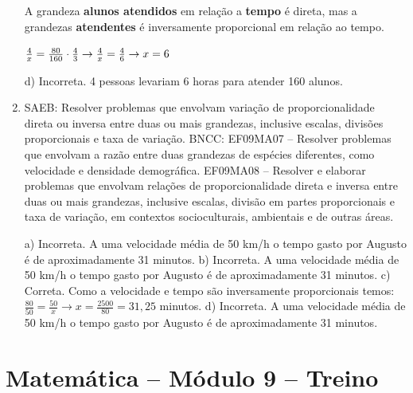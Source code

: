 \begin{enumerate}
A grandeza \textbf{alunos atendidos} em relação a \textbf{tempo} é direta,
mas a grandezas \textbf{atendentes} é inversamente proporcional em relação 
ao tempo.

$\frac{4}{x} = \frac{80}{160} \cdot \frac{4}{3} \rightarrow \\
\frac{4}{x} = \frac{4}{6} \rightarrow x = 6$

d) Incorreta. 4 pessoas levariam 6 horas para atender 160 alunos.

\item
SAEB: Resolver problemas que envolvam variação de proporcionalidade 
direta ou inversa entre duas ou mais grandezas, inclusive escalas, divisões 
proporcionais e taxa de variação.
BNCC: EF09MA07 --  Resolver problemas que envolvam a razão entre duas grandezas de espécies diferentes, como velocidade e densidade demográfica.
EF09MA08 -- Resolver e elaborar problemas que envolvam relações de proporcionalidade direta e inversa entre duas ou mais grandezas, inclusive escalas, divisão em partes proporcionais e taxa de variação, em contextos socioculturais, ambientais e de outras áreas.

a) Incorreta. A uma velocidade média de 50 km/h o tempo gasto por Augusto é de aproximadamente 31 minutos.
b) Incorreta. A uma velocidade média de 50 km/h o tempo gasto por Augusto é de aproximadamente 31 minutos. 
c) Correta. Como a velocidade e tempo são inversamente proporcionais temos: 
$\frac{80}{50} = \frac{50}{x} \rightarrow x = \frac{2500}{80} = 31,25$
minutos.
d) Incorreta. A uma velocidade média de 50 km/h o tempo gasto por Augusto é de aproximadamente 31 minutos.
\end{enumerate}

\section*{Matemática – Módulo 9 – Treino}

